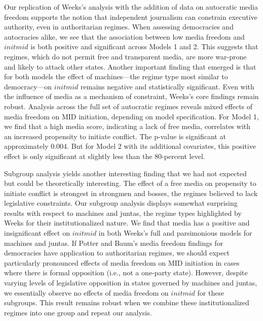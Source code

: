 \documentclass[12pt]{article}
\begin{document}
\par Our replication of Weeks's analysis with the addition of data on autocratic media freedom supports the notion that independent journalism can constrain executive authority, even in authoritarian regimes. When assessing democracies and autocracies alike, we see that the association between low media freedom and $initmid$ is both positive and significant across Models 1 and 2. This suggests that regimes, which do not permit free and transparent media, are more war-prone and likely to attack other states. Another important finding that emerged is that for both models the effect of machines---the regime type most similar to democracy---on $initmid$ remains negative and statistically significant. Even with the influence of media as a mechanism of constraint, Weeks's core findings remain robust. Analysis across the full set of autocratic regimes reveals mixed effects of media freedom on MID initiation, depending on model specification. For Model 1, we find that a high media score, indicating a lack of free media, correlates with an increased propensity to initiate conflict. The p-value is significant at approximately 0.004. But for Model 2 with its additional covariates, this positive effect is only significant at slightly less than the 80-percent level.

\par Subgroup analysis yields another interesting finding that we had not expected but could be theoretically interesting. The effect of a free media on propensity to initiate conflict is strongest in strongmen and bosses, the regimes believed to lack legislative constraints. Our subgroup analysis displays somewhat surprising results with respect to machines and juntas, the regime types highlighted by Weeks for their institutionalized nature. We find that media has a positive and insignificant effect on $initmid$ in both Weeks's full and parsimonious models for machines and juntas. If Potter and Baum's \autocite*{potter:2014} media freedom findings for democracies have application to authoritarian regimes, we should expect particularly pronounced effects of media freedom on MID initiation in cases where there is formal opposition (i.e., not a one-party state). However, despite varying levels of legislative opposition in states governed by machines and juntas, we essentially observe no effects of media freedom on $initmid$ for these subgroups. This result remains robust when we combine these institutionalized regimes into one group and repeat our analysis.
\end{document}
